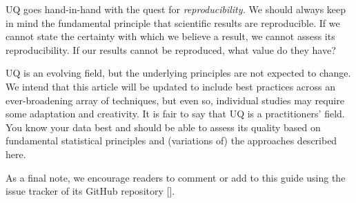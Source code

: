 UQ goes hand-in-hand with the quest for \emph{reproducibility.}  We should always keep in mind the fundamental principle that scientific results are reproducible.  If we cannot state the certainty with which we believe a result, we cannot assess its reproducibility.  If our results cannot be reproduced, what value do they have?

UQ is an evolving field, but the underlying principles are not expected to change.
We intend that this article will be updated to include best practices across an ever-broadening array of techniques, but even so, individual studies may require some adaptation and creativity.
It is fair to say that UQ is a practitioners' field.  You know your data best and should be able to assess its quality based on fundamental statistical principles and (variations of) the approaches described here.

As a final note, we encourage readers to comment or add to this guide using the issue tracker of its GitHub repository [\githubrepository].
